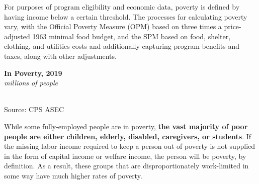 \documentclass{report}
\newcommand{\barylab}[2]{yticklabel style={text width=#1, align=right, 
		style={black!70}, text height=#2},}
\newcommand{\bbar}[2]{extra #1 ticks = {{#2}}, extra #1 tick labels = ,
		extra #1 tick style = {grid=major, grid style={thick, black!25}},}
\newcommand{\barplotnogrid}{xbar=0pt, axis line style={draw=none},
	    yticklabel style={align=left, anchor=east},
      		xmajorticks=false, ymajorgrids=false,   
	    ytick=data, tickwidth=0pt, area legend, reverse legend,
	    nodes near coords, nodes near coords align={horizontal},}
\begin{document}
{\begin{minipage}{0.76\textwidth}
For purposes of program eligibility and economic data, poverty is defined by having income below a certain threshold. The processes for calculating poverty vary, with the Official Poverty Measure (OPM) based on three times a price-adjusted 1963 minimal food budget, and the SPM based on food, shelter, clothing, and utilities costs and additionally capturing program benefits and taxes, along with other adjustments.
\end{minipage} \hspace{6mm}
\begin{minipage}{0.24\textwidth}
\normalsize \textbf{In Poverty, 2019}\\
\footnotesize{\textit{millions of people}}\\
  \hspace*{-4mm} \\
\footnotesize{Source: CPS ASEC}
\vfill
\end{minipage}
\vspace{1mm}

\begin{minipage}{0.76\textwidth}
\small While some fully-employed people are in poverty, \textbf{the vast majority of poor people are either children, elderly, disabled, caregivers, or students}.  If the missing labor income required to keep a person out of poverty is not supplied in the form of capital income or welfare income, the person will be poverty, by definition. As a result, these groups that are disproportionately work-limited in some way have much higher rates of poverty. 
\vspace{1mm}


\end{minipage}}
\end{document}
